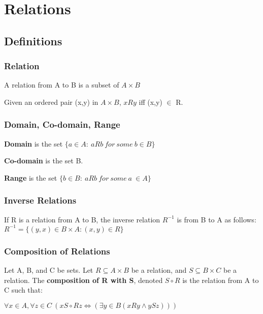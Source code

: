 \documentclass{article}
\begin{document}
\section{Relations}
\subsection{Definitions}
\subsubsection{Relation}
A relation from A to B is a subset of $A\times B$

Given an ordered pair (x,y) in $A\times B$, $xRy$ iff (x,y) $\in$ R.

\subsubsection{Domain, Co-domain, Range}
\textbf{Domain} is the set $\{ a \in A :\ aRb\ for\ some\ b \in B\}$

\vspace{10pt}

\textbf{Co-domain} is the set B.

\vspace{10pt}

\textbf{Range} is the set $\{b \in B :\ aRb\ for\ some\ a\ \in A\}$

\subsubsection{Inverse Relations}
If R is a relation from A to B, the inverse relation $R^{-1}$ is from B to A as follows:
$R^{-1} = \{(y,x) \in B \times A : (x,y) \in R\}$

\subsubsection{Composition of Relations}
Let A, B, and C be sets. Let $R \subseteq A \times B$ be a relation, and $S \subseteq B \times C$ be a relation. The \textbf{composition of R with S}, denoted $S \circ R$ is the relation from A to C such that:

\vspace{10pt}

$\forall x \in A, \forall z \in C\ (x S \circ R z \iff (\exists y \in B (xRy \wedge ySz)))$

\vspace{10pt}
\end{document}
